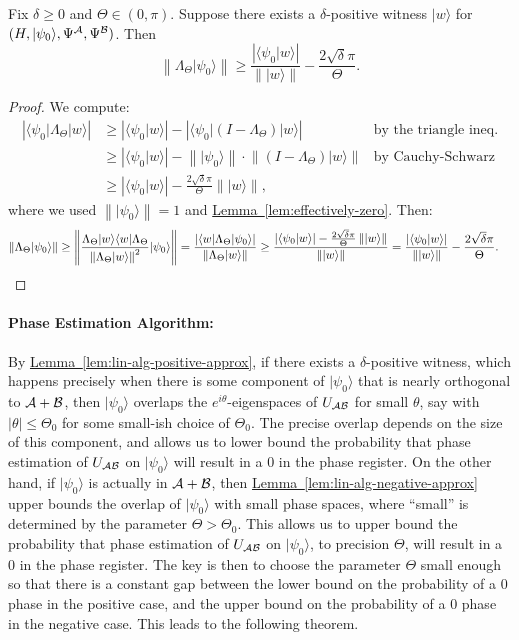 \documentclass{article}
\newcommand{\lem}[1]{\hyperref[lem:#1]{Lemma~\ref*{lem:#1}}}
\def\ket#1{{\lvert}#1\rangle}
\def\bra#1{{\langle}#1\rvert}
\renewcommand{\>}{\rangle}
\newcommand{\<}{\langle}
\renewcommand{\(}{\left(}
\renewcommand{\)}{\right)}
\def\braket#1#2{{{\langle}#1\vert}#2\rangle}
\def\norm#1{\left\| #1 \right\|}
\begin{document}
\begin{lemma} \label{lem:lin-alg-positive-approx}
Fix $\delta\geq 0$ and $\Theta\in (0,\pi)$.
Suppose there exists a $\delta$-positive witness $\ket{w}$ for $(H,\ket{\psi_0},\Psi^{\cal A},\Psi^{\cal B})$. Then
\begin{equation*}
\norm{\Lambda_\Theta\ket{\psi_0}} \geq \frac{|\braket{\psi_0}{w}|}{\norm{\ket{w}}} - \frac{2\sqrt{\delta}\pi}{\Theta}.
\end{equation*}
\end{lemma}
\begin{proof}
We compute:
\begin{align*}
|\bra{\psi_0}\Lambda_\Theta\ket{w}| &\geq |\braket{\psi_0}{w}| - |\bra{\psi_0}(I-\Lambda_\Theta)\ket{w}| & \mbox{by the triangle ineq.}\\
&\geq |\braket{\psi_0}{w}| - \norm{\ket{\psi_0}}\cdot\norm{(I-\Lambda_\Theta)\ket{w}} & \mbox{by Cauchy-Schwarz}\\
&\geq |\braket{\psi_0}{w}| - \frac{2\sqrt{\delta}\pi}{\Theta}\norm{\ket{w}},
\end{align*}
where we used $\norm{\ket{\psi_0}}=1$ and \lem{effectively-zero}.
Then:
\begin{align*}
\norm{\Lambda_\Theta\ket{\psi_0}} &\geq \norm{\frac{\Lambda_\Theta\ket{w}\bra{w}\Lambda_\Theta}{\norm{\Lambda_\Theta\ket{w}}^2}\ket{\psi_0}}
= \frac{|\bra{w}\Lambda_\Theta\ket{\psi_0}|}{\norm{\Lambda_\Theta\ket{w}}}
\geq \frac{|\braket{\psi_0}{w}|-\frac{2\sqrt{\delta}\pi}{\Theta}\norm{\ket{w}}}{\norm{\ket{w}}}
= \frac{|\braket{\psi_0}{w}|}{\norm{\ket{w}}} - \frac{2\sqrt{\delta}\pi}{\Theta}.\qedhere
\end{align*}
\end{proof}

\paragraph{Phase Estimation Algorithm:}

By \lem{lin-alg-positive-approx}, if there exists a $\delta$-positive witness, which happens precisely when there is some component of $\ket{\psi_0}$ that is nearly orthogonal to ${\cal A}+{\cal B}$, then $\ket{\psi_0}$ overlaps the $e^{i\theta}$-eigenspaces of $U_{\cal AB}$ for small $\theta$, say with $|\theta|\leq \Theta_0$ for some small-ish choice of $\Theta_0$. The precise overlap depends on the size of this component, and allows us to lower bound the probability that phase estimation of $U_{\cal AB}$ on $\ket{\psi_0}$ will result in a 0 in the phase register. On the other hand, if $\ket{\psi_0}$ is actually in ${\cal A}+{\cal B}$, then \lem{lin-alg-negative-approx} upper bounds the overlap of $\ket{\psi_0}$ with small phase spaces, where ``small'' is determined by the parameter $\Theta>\Theta_0$. This allows us to upper bound the probability that phase estimation of $U_{\cal AB}$ on $\ket{\psi_0}$, to precision $\Theta$, will result in a 0 in the phase register. The key is then to choose the parameter $\Theta$ small enough so that there is a constant gap between the lower bound on the probability of a 0 phase in the positive case, and the upper bound on the probability of a 0 phase in the negative case. This leads to the following theorem.
\end{document}

